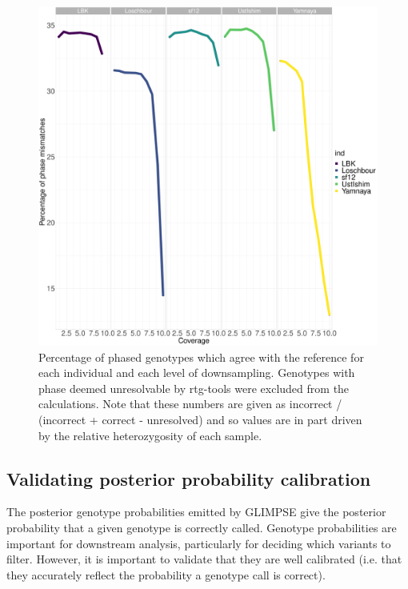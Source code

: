 \begin{figure}[htp]
    \centering
    \includegraphics[width=1.0\textwidth]{../images/chapter1/phasing_performance_downsampled.pdf}
    \caption{Percentage of phased genotypes which agree with the reference for each individual and each level of downsampling. Genotypes with phase deemed unresolvable by rtg-tools were excluded from the calculations. Note that these numbers are given as incorrect / (incorrect + correct - unresolved) and so values are in part driven by the relative heterozygosity of each sample.}
    \label{fig:phasing_performance_downsampled}
\end{figure}

\subsection{Validating posterior probability calibration}

The posterior genotype probabilities emitted by GLIMPSE give the posterior probability that a given genotype is correctly called. Genotype probabilities are important for downstream analysis, particularly for deciding which variants to filter. However, it is important to validate that they are well calibrated (i.e. that they accurately reflect the probability a genotype call is correct).

